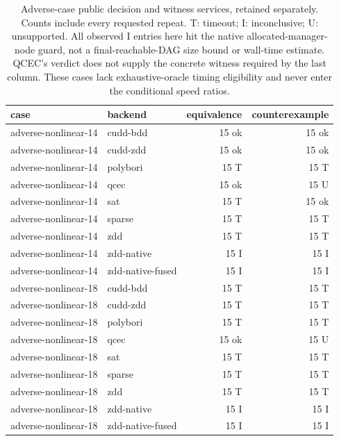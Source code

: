 \begin{table}[tbp]
\centering\scriptsize
\setlength{\tabcolsep}{3pt}
\caption{Adverse-case public decision and witness services, retained separately. Counts include every requested repeat. T: timeout; I: inconclusive; U: unsupported. All observed I entries here hit the native allocated-manager-node guard, not a final-reachable-DAG size bound or wall-time estimate. QCEC's verdict does not supply the concrete witness required by the last column. These cases lack exhaustive-oracle timing eligibility and never enter the conditional speed ratios.}
\label{tab:current-adverse}
\begin{tabular}{p{3.4cm}p{3.2cm}rr}
\toprule
case & backend & equivalence & counterexample \\
\midrule
adverse-nonlinear-14 & cudd-bdd & 15 ok & 15 ok \\
adverse-nonlinear-14 & cudd-zdd & 15 ok & 15 ok \\
adverse-nonlinear-14 & polybori & 15 T & 15 T \\
adverse-nonlinear-14 & qcec & 15 ok & 15 U \\
adverse-nonlinear-14 & sat & 15 T & 15 ok \\
adverse-nonlinear-14 & sparse & 15 T & 15 T \\
adverse-nonlinear-14 & zdd & 15 T & 15 T \\
adverse-nonlinear-14 & zdd-native & 15 I & 15 I \\
adverse-nonlinear-14 & zdd-native-fused & 15 I & 15 I \\
adverse-nonlinear-18 & cudd-bdd & 15 T & 15 T \\
adverse-nonlinear-18 & cudd-zdd & 15 T & 15 T \\
adverse-nonlinear-18 & polybori & 15 T & 15 T \\
adverse-nonlinear-18 & qcec & 15 ok & 15 U \\
adverse-nonlinear-18 & sat & 15 T & 15 T \\
adverse-nonlinear-18 & sparse & 15 T & 15 T \\
adverse-nonlinear-18 & zdd & 15 T & 15 T \\
adverse-nonlinear-18 & zdd-native & 15 I & 15 I \\
adverse-nonlinear-18 & zdd-native-fused & 15 I & 15 I \\
\bottomrule
\end{tabular}
\end{table}
